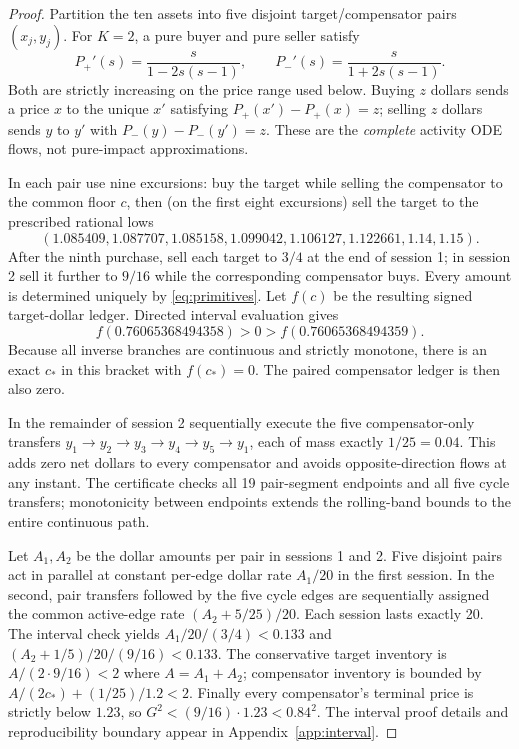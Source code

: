\documentclass[review,hidelinks,onefignum,onetabnum]{siamonline250211}%
\begin{document}
\begin{proof}
Partition the ten assets into five disjoint target/compensator
pairs $(x_j,y_j)$. For $K=2$, a pure buyer and pure seller satisfy
\begin{equation}\label{eq:primitives}
 P_+'(s)=\frac{s}{1-2s(s-1)},\qquad
 P_-'(s)=\frac{s}{1+2s(s-1)}.
\end{equation}
Both are strictly increasing on the price range used below.
Buying $z$ dollars sends a price $x$ to the unique $x'$ satisfying
$P_+(x')-P_+(x)=z$; selling $z$ dollars sends $y$ to $y'$ with
$P_-(y)-P_-(y')=z$. These are the \emph{complete} activity ODE
flows, not pure-impact approximations.

In each pair use nine excursions: buy the target while selling the
compensator to the common floor $c$, then (on the first eight
excursions) sell the target to the prescribed rational lows
\begin{equation}\label{eq:lows}
 (1.085409,1.087707,1.085158,1.099042,
 1.106127,1.122661,1.14,1.15).
\end{equation}
After the ninth purchase, sell each target to $3/4$ at the end of
session 1; in session 2 sell it further to $9/16$ while the
corresponding compensator buys. Every amount is determined
uniquely by \eqref{eq:primitives}. Let $f(c)$ be the resulting
signed target-dollar ledger. Directed interval evaluation gives
\begin{equation}\label{eq:root}
 f(0.76065368494358)>0>f(0.76065368494359).
\end{equation}
Because all inverse branches are continuous and strictly monotone,
there is an exact $c_*$ in this bracket with $f(c_*)=0$.
The paired compensator ledger is then also zero.

In the remainder of session 2 sequentially execute the five
compensator-only transfers
$y_1\to y_2\to y_3\to y_4\to y_5\to y_1$, each of
mass exactly $1/25=0.04$. This adds zero net dollars to every
compensator and avoids opposite-direction flows at any instant.
The certificate checks all 19 pair-segment endpoints and all five
cycle transfers; monotonicity between endpoints extends the
rolling-band bounds to the entire continuous path.

Let $A_1,A_2$ be the dollar amounts per pair in sessions 1 and 2.
Five disjoint pairs act in parallel at constant per-edge dollar rate
$A_1/20$ in the first session. In the second, pair transfers followed
by the five cycle edges are sequentially assigned the common
active-edge rate $(A_2+5/25)/20$. Each session lasts exactly 20.
The interval check yields $A_1/20/(3/4)<0.133$ and
$(A_2+1/5)/20/(9/16)<0.133$.
The conservative target inventory is $A/(2\cdot9/16)<2$
where $A=A_1+A_2$; compensator inventory is bounded by
$A/(2c_*)+(1/25)/1.2<2$. Finally every compensator's
terminal price is strictly below $1.23$, so
$G^2<(9/16)\cdot1.23<0.84^2$.
The interval proof details and reproducibility boundary appear in
Appendix~\ref{app:interval}.
\end{proof}
\end{document}
